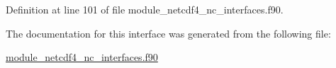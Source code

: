 Definition at line 101 of file module\+\_\+netcdf4\+\_\+nc\+\_\+interfaces.\+f90.



The documentation for this interface was generated from the following file\+:\begin{DoxyCompactItemize}
\item 
\hyperlink{module__netcdf4__nc__interfaces_8f90}{module\+\_\+netcdf4\+\_\+nc\+\_\+interfaces.\+f90}\end{DoxyCompactItemize}
